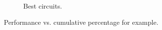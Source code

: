 \begin{figure}[t]
\begin{subfigure}[b]{0.3\columnwidth}
\caption{Best circuits.}
\end{subfigure}%
\caption{Performance vs. cumulative percentage for  example.\label{fig:mm1_cumpercent}}
\end{figure}